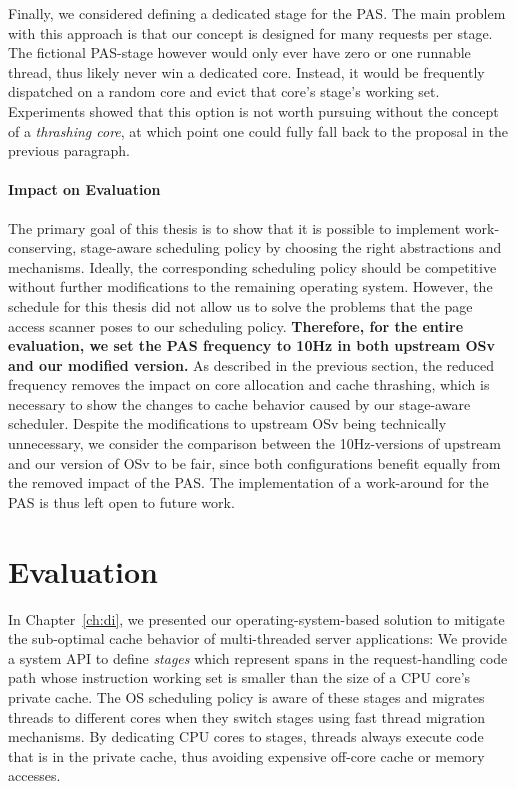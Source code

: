 \documentclass[12pt,a4paper]{book}
\begin{document}
Finally, we considered defining a dedicated stage for the PAS.
The main problem with this approach is that our concept is designed for many requests per stage.
The fictional PAS-stage however would only ever have zero or one runnable thread, thus likely never win a dedicated core.
Instead, it would be frequently dispatched on a random core and evict that core's stage's working set.
Experiments showed that this option is not worth pursuing without the concept of a \emph{thrashing core}, at which point one could fully fall back to the proposal in the previous paragraph.

\subsubsection{Impact on Evaluation}\label{ch:di:pol:pas:eval}
The primary goal of this thesis is to show that it is possible to implement work-conserving, stage-aware scheduling policy by choosing the right abstractions and mechanisms.
Ideally, the corresponding scheduling policy should be competitive without further modifications to the remaining operating system.
However, the schedule for this thesis did not allow us to solve the problems that the page access scanner poses to our scheduling policy.
\textbf{Therefore, for the entire evaluation, we set the PAS frequency to 10Hz in both upstream OSv and our modified version.}
As described in the previous section, the reduced frequency removes the impact on core allocation and cache thrashing, which is necessary to show the changes to cache behavior caused by our stage-aware scheduler.
Despite the modifications to upstream OSv being technically unnecessary, we consider the comparison between the 10Hz-versions of upstream and our version of OSv to be fair, since both configurations benefit equally from the removed impact of the PAS.
The implementation of a work-around for the PAS is thus left open to future work.




\chapter{Evaluation}\label{ch:eval}
In Chapter~\ref{ch:di}, we presented our operating-system-based solution to mitigate the sub-optimal cache behavior of multi-threaded server applications:
We provide a system API to define \emph{stages} which represent spans in the request-handling code path whose instruction working set is smaller than the size of a CPU core's private cache.
The OS scheduling policy is aware of these stages and migrates threads to different cores when they switch stages using fast thread migration mechanisms.
By dedicating CPU cores to stages, threads always execute code that is in the private cache, thus avoiding expensive off-core cache or memory accesses.
\end{document}
